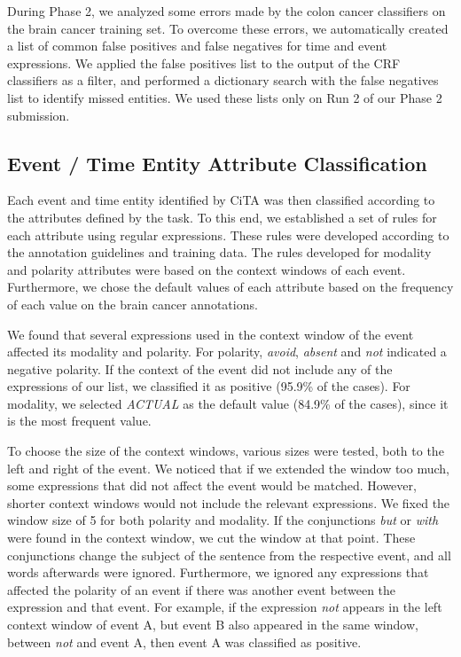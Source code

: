 \documentclass[11pt,a4paper]{article}
\begin{document}
During Phase 2, we analyzed some errors made by the colon cancer classifiers on the brain cancer training set.
To overcome these errors, we automatically created a list of common false positives and false negatives for time and event expressions.
We applied the false positives list to the output of the CRF classifiers as a filter, and performed a dictionary search with the false negatives list to identify missed entities.
We used these lists only on Run 2 of our Phase 2 submission.

\subsection{Event / Time Entity Attribute Classification}

Each event and time entity identified by CiTA was then classified according to the attributes defined by the task.
To this end, we established a set of rules for each attribute using regular expressions.
These rules were developed according to the annotation guidelines and training data.
The rules developed for modality and polarity attributes were based on the context windows of each event.
Furthermore, we chose the default values of each attribute based on the frequency of each value on the brain cancer annotations.

We found that several expressions used in the context window of the event affected its modality and polarity.
For polarity, \textit{avoid}, \textit{absent} and \textit{not} indicated a negative polarity.
If the context of the event did not include any of the expressions of our list, we classified it as positive (95.9\% of the cases).
For modality, we selected \textit{ACTUAL} as the default value (84.9\% of the cases), since it is the most
frequent value.

To choose the size of the context windows, various sizes were tested, both to the left and right of the event.
We noticed that if we extended the window too much, some expressions that did not affect the event would be matched.
However, shorter context windows would not include the relevant expressions.
We fixed the window size of 5 for both polarity and modality.
If the conjunctions \textit{but} or \textit{with} were found in the context window, we cut the window at that point.
These conjunctions change the subject of the sentence from the respective event, and all words afterwards were ignored.
Furthermore, we ignored any expressions that affected the polarity of an event if there was another event between the expression and that event.
For example, if the expression \textit{not} appears in the left context window of event A, but event B also appeared in the same window, between \textit{not} and event A, then event A was classified as positive.
\end{document}

